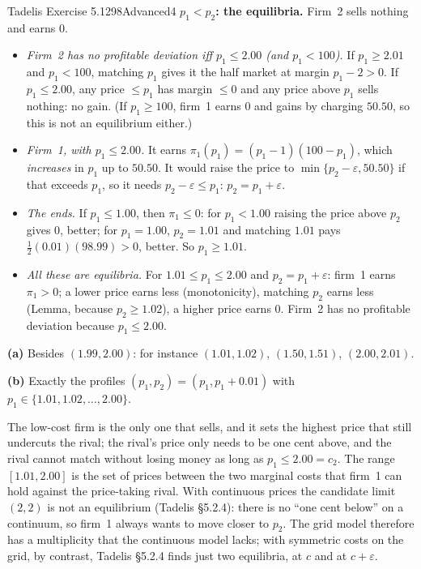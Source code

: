 \begin{exsol}{Tadelis Exercise 5.12}{98}{Advanced}{4}
\textbf{$p_1 < p_2$: the equilibria.} Firm~2 sells nothing and earns $0$.
\begin{itemize}
  \item \emph{Firm~2 has no profitable deviation iff $p_1 \le 2.00$ (and $p_1 < 100$).} If $p_1 \ge 2.01$ and $p_1 < 100$, matching $p_1$ gives it
  the half market at margin $p_1 - 2 > 0$. If $p_1 \le 2.00$, any price $\le p_1$ has margin $\le 0$ and any price above $p_1$ sells nothing:
  no gain. (If $p_1 \ge 100$, firm~1 earns $0$ and gains by charging $50.50$, so this is not an equilibrium either.)
  \item \emph{Firm~1, with $p_1 \le 2.00$.} It earns $\pi_1(p_1) = (p_1 - 1)(100 - p_1)$, which \emph{increases} in $p_1$ up to $50.50$. It would
  raise the price to $\min\{p_2 - \varepsilon, 50.50\}$ if that exceeds $p_1$, so it needs $p_2 - \varepsilon \le p_1$: $p_2 = p_1 + \varepsilon$.
  \item \emph{The ends.} If $p_1 \le 1.00$, then $\pi_1 \le 0$: for $p_1 < 1.00$ raising the price above $p_2$ gives $0$, better; for $p_1 = 1.00$,
  $p_2 = 1.01$ and matching $1.01$ pays $\tfrac12(0.01)(98.99) > 0$, better. So $p_1 \ge 1.01$.
  \item \emph{All these are equilibria.} For $1.01 \le p_1 \le 2.00$ and $p_2 = p_1 + \varepsilon$: firm~1 earns $\pi_1 > 0$; a lower price earns less
  (monotonicity), matching $p_2$ earns less (Lemma, because $p_2 \ge 1.02$), a higher price earns $0$. Firm~2 has no profitable deviation
  because $p_1 \le 2.00$.
\end{itemize}

\textbf{(a)} Besides $(1.99, 2.00)$: for instance $(1.01, 1.02)$, $(1.50, 1.51)$, $(2.00, 2.01)$.

\textbf{(b)} Exactly the profiles $(p_1, p_2) = (p_1, p_1 + 0.01)$ with $p_1 \in \{1.01, 1.02, \dots, 2.00\}$.


\interp The low-cost firm is the only one that sells, and it sets the highest price that still undercuts the rival; the
rival's price only needs to be one cent above, and the rival cannot match without losing money
as long as $p_1 \le 2.00 = c_2$. The range $[1.01, 2.00]$ is the set of prices between the two marginal
costs that firm~1 can hold against the price-taking rival. With continuous prices the candidate limit
$(2,2)$ is not an equilibrium (Tadelis \S5.2.4): there is no ``one cent below'' on a continuum, so
firm~1 always wants to move closer to $p_2$. The grid model therefore has a multiplicity that the
continuous model lacks; with symmetric costs on the grid, by contrast, Tadelis \S5.2.4 finds just two
equilibria, at $c$ and at $c + \varepsilon$.


\end{exsol}
